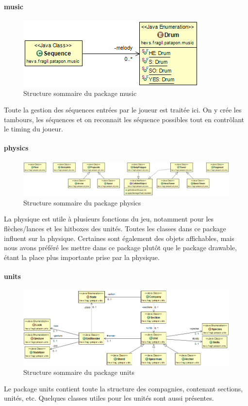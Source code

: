 \documentclass[a4paper,10pt]{article}
\begin{document}
  \paragraph{music}
  \begin{figure}[!h]
 \centering
 \includegraphics[scale=0.4]{images/Music}
 \caption{Structure sommaire du package music}
 \end{figure}
  Toute la gestion des séquences entrées par le joueur est traitée ici. On y crée les tambours, les séquences et on reconnait les séquence possibles tout en contrôlant le timing du joueur.
  
  \paragraph{physics}
  \begin{figure}[!h]
 \centering
 \includegraphics[scale=0.4]{images/Physics}
 \caption{Structure sommaire du package physics}
 \end{figure}
  La physique est utile à plusieurs fonctions du jeu, notamment pour les flèches/lances et les hitboxes des unités. Toutes les classes dans ce package influent sur la physique. Certaines sont également des objets affichables, mais nous avons préféré les mettre dans ce package plutôt que le package drawable, étant la place plus importante prise par la physique.
  \paragraph{units}
  \begin{figure}[!h]
 \centering
 \includegraphics[scale=0.4]{images/Units}
 \caption{Structure sommaire du package units}
 \end{figure}
  Le package units contient toute la structure des compagnies, contenant sections, unités, etc. Quelques classes utiles pour les unités sont aussi présentes.
  
\end{document}
